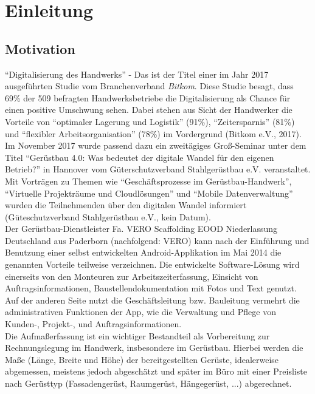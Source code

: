 \chapter{Einleitung}
\section{Motivation}\label{subsec:motivation}
``Digitalisierung des Handwerks'' - Das ist der Titel einer im Jahr 2017 ausgeführten Studie vom Branchenverband \textit{Bitkom}. 
Diese Studie besagt, dass 69\% der 509 befragten Handwerksbetriebe die Digitalisierung als Chance für einen positive Umschwung sehen. 
Dabei stehen aus Sicht der Handwerker die Vorteile von ``optimaler Lagerung und Logistik'' (91\%), ``Zeitersparnis'' (81\%) und ``flexibler Arbeitsorganisation'' (78\%) im Vordergrund (Bitkom e.V., 2017). \\

Im November 2017 wurde passend dazu ein zweitägiges Groß-Seminar unter dem Titel ``Gerüstbau 4.0: Was bedeutet der digitale Wandel für den eigenen Betrieb?'' in Hannover vom Güterschutzverband Stahlgerüstbau e.V. veranstaltet. 
Mit Vorträgen zu Themen wie ``Geschäftsprozesse im Gerüstbau-Handwerk'', ``Virtuelle Projekträume und Cloudlösungen'' und ``Mobile Datenverwaltung'' wurden die Teilnehmenden über den digitalen Wandel informiert (Güteschutzverband Stahlgerüstbau e.V., kein Datum). \\

Der Gerüstbau-Dienstleister Fa. VERO Scaffolding EOOD Niederlassung Deutschland aus Paderborn (nachfolgend: \textsc{VERO}) kann nach der Einführung und Benutzung einer selbst entwickelten Android-Applikation im Mai 2014 die genannten Vorteile teilweise verzeichnen.
Die entwickelte Software-Lösung wird einerseits von den Monteuren zur Arbeitszeiterfassung, Einsicht von Auftragsinformationen, Baustellendokumentation mit Fotos und Text genutzt. Auf der anderen Seite nutzt die Geschäftsleitung bzw. Bauleitung vermehrt die administrativen Funktionen der App, wie die Verwaltung und Pflege von Kunden-, Projekt-, und Auftragsinformationen. \\

Die Aufmaßerfassung ist ein wichtiger Bestandteil als Vorbereitung zur Rechnungslegung im Handwerk, insbesondere im Gerüstbau. 
Hierbei werden die Maße (Länge, Breite und Höhe) der bereitgestellten Gerüste, idealerweise abgemessen, meistens jedoch abgeschätzt und später im Büro mit einer Preisliste nach Gerüsttyp (Fassadengerüst, Raumgerüst, Hängegerüst, ...) abgerechnet. \\

